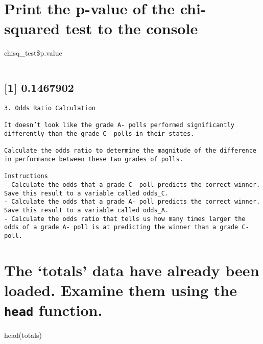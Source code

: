 \documentclass[
]{article}
\begin{document}
\begin{verbatim}
\end{verbatim}

\hypertarget{print-the-p-value-of-the-chi-squared-test-to-the-console}{%
\section{Print the p-value of the chi-squared test to the
console}\label{print-the-p-value-of-the-chi-squared-test-to-the-console}}

chisq\_test\$p.value

\begin{verbatim}
\end{verbatim}

\hypertarget{section-8}{%
\subsection{{[}1{]} 0.1467902}\label{section-8}}

\begin{verbatim}
3. Odds Ratio Calculation

It doesn’t look like the grade A- polls performed significantly differently than the grade C- polls in their states.

Calculate the odds ratio to determine the magnitude of the difference in performance between these two grades of polls.

Instructions
- Calculate the odds that a grade C- poll predicts the correct winner. Save this result to a variable called odds_C.
- Calculate the odds that a grade A- poll predicts the correct winner. Save this result to a variable called odds_A. 
- Calculate the odds ratio that tells us how many times larger the odds of a grade A- poll is at predicting the winner than a grade C- poll.
\end{verbatim}

\hypertarget{the-totals-data-have-already-been-loaded.-examine-them-using-the-head-function.-1}{%
\section{\texorpdfstring{The `totals' data have already been loaded.
Examine them using the \texttt{head}
function.}{The `totals' data have already been loaded. Examine them using the head function.}}\label{the-totals-data-have-already-been-loaded.-examine-them-using-the-head-function.-1}}

head(totals)
\end{document}
